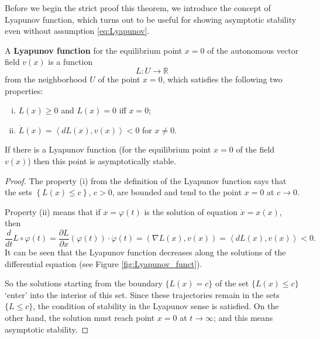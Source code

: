 Before we begin the strict proof this theorem, we introduce the concept of Lyapunov function, which turns out to be useful for showing asymptotic stability even without assumption \eqref{eq:Lyapunov}.

\begin{definition}\label{def:Lyap_funct}
	A \textbf{Lyapunov function} for the equilibrium point $x = 0$ of the autonomous vector field $v(x)$ is a function
	$$L: U \to \mathbb{R}$$
	from the neighborhood $U$ of the point $x = 0$, which satisfies the following two properties:
	\begin{enumerate}[(i)]
		\item $L(x) \geq 0$ and $L(x) = 0$ iff $x=0$;
		\item $\dot{L}(x) = \left\langle dL(x), v(x) \right\rangle < 0$ for $x \neq 0$.
	\end{enumerate}
\end{definition}

\begin{proposition}\label{prop:asymp_stable}
	If there is a Lyapunov function (for the equilibrium point $x = 0$ of the field $v(x)$) then this point is asymptotically stable.
	\begin{proof}
		The property (i) from the definition of the Lyapunov function says that the sets $\left\lbrace L(x) \leq c \right\rbrace$, $c> 0$, are bounded and tend to the point $x = 0$ at $c \to 0$.
		
		Property (ii) means that if $x = \varphi(t)$ is the solution of equation $\dot{x} = x(x)$, then
		$$\frac{d}{dt} L \circ \varphi(t) = \frac{\partial L}{\partial x}(\varphi(t))\cdot\dot{\varphi}(t) = \left(\nabla L(x), v(x) \right) = \left\langle dL(x), v(x) \right\rangle < 0.$$
		It can be seen that the Lyapunov function decreases along the solutions of the differential equation (see Figure \ref{fig:Lyapunov_funct}).
		
		So the solutions starting from the boundary $\{L (x) = c\}$ of the set $\{L (x) \leq c\}$ `enter' into the interior of this set. Since these trajectories remain in the sets $\{L\leq c\}$, the condition of stability in the Lyapunov sense is satisfied. On the other hand, the solution must reach point $x = 0$ at $t\to \infty$; and this means asymptotic stability.
	\end{proof}
\end{proposition}

